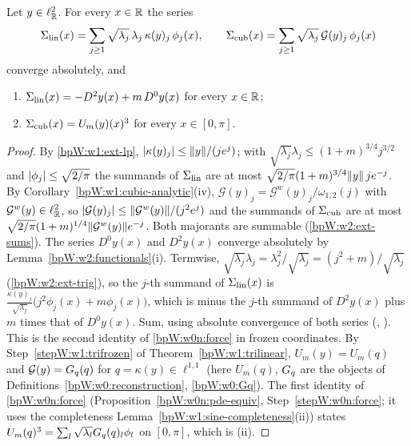 \begin{lemma}\label{bpW:w2:force}
Let $y\in\ell^2_{\mathbb{R}}$. For every $x\in\mathbb{R}$ the series
\[\Sigma_{\rm lin}(x)=\sum_{j\ge1}\sqrt{\lambda_j}\,\lambda_j\,\kappa(y)_j\,\phi_j(x),\qquad
\Sigma_{\rm cub}(x)=\sum_{j\ge1}\sqrt{\lambda_j}\,\mathcal G(y)_j\,\phi_j(x)\]
converge absolutely, and
\begin{enumerate}[label=(\roman*)]
\item $\Sigma_{\rm lin}(x)=-D^2y(x)+m\,D^0y(x)$ for every $x\in\mathbb{R}$;
\item $\Sigma_{\rm cub}(x)=U_m(y)(x)^3$ for every $x\in[0,\pi]$.
\end{enumerate}
\end{lemma}

\begin{proof}
\label{stepW:w2:fsum}
By \ref{bpW:w1:ext-lp}, $\lvert \kappa(y)_j\rvert\le\lVert y\rVert/(je^j)$; with $\sqrt{\lambda_j}\lambda_j\le(1+m)^{3/4}j^{3/2}$ and
$\lvert \phi_j\rvert\le\sqrt{2/\pi}$ the summands of $\Sigma_{\rm lin}$ are at most $\sqrt{2/\pi}(1+m)^{3/4}\lVert y\rVert\,
je^{-j}$. By Corollary~\ref{bpW:w1:cubic-analytic}(iv), $\mathcal G(y)_j=\mathcal G^w(y)_j/\omega_{1,2}(j)$ with
$\mathcal G^w(y)\in\ell^2_{\mathbb{R}}$, so $\lvert \mathcal G(y)_j\rvert\le\lVert \mathcal G^w(y)\rVert/(j^2e^j)$ and the summands of
$\Sigma_{\rm cub}$ are at most $\sqrt{2/\pi}(1+m)^{1/4}\lVert \mathcal G^w(y)\rVert e^{-j}$. Both majorants are summable
(\ref{bpW:w2:ext-sums}). The series $D^0y(x)$ and $D^2y(x)$ converge absolutely by
Lemma~\ref{bpW:w2:functionals}(i).
\label{stepW:w2:flin}
Termwise, $\sqrt{\lambda_j}\lambda_j=\lambda_j^2/\sqrt{\lambda_j}=(j^2+m)/\sqrt{\lambda_j}$ (\ref{bpW:w2:ext-trig}), so
the $j$-th summand of $\Sigma_{\rm lin}(x)$ is $\frac{\kappa(y)_j}{\sqrt{\lambda_j}}\bigl(j^2\phi_j(x)+m\phi_j(x)\bigr)$,
which is minus the $j$-th summand of $D^2y(x)$ plus $m$ times that of $D^0y(x)$. Sum, using absolute convergence of
both series (, ). This is the second identity of
\eqref{bpW:w0n:force} in frozen coordinates.
\label{stepW:w2:fcub}
By Step~\ref{stepW:w1:trifrozen} of Theorem~\ref{bpW:w1:trilinear}, $U_m(y)=U_m(q)$ and $\mathcal G(y)=G_q(q)$ for
$q=\kappa(y)\in\ell^{1,1}$ (here $U_m(q)$, $G_q$ are the objects of Definitions~\ref{bpW:w0:reconstruction},
\ref{bpW:w0:Gq}). The first identity of \eqref{bpW:w0n:force} (Proposition~\ref{bpW:w0n:pde-equiv}, Step~\ref{stepW:w0n:force};
it uses the completeness Lemma~\ref{bpW:w1:sine-completeness}(ii)) states $U_m(q)^3=\sum_l\sqrt{\lambda_l}G_q(q)_l\phi_l$
on $[0,\pi]$, which is (ii).
\end{proof}

